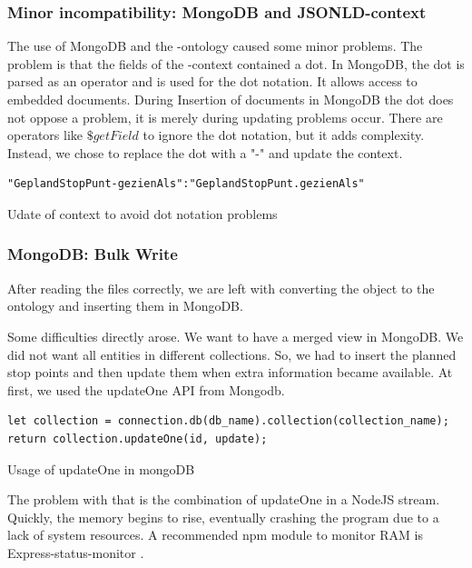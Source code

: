 \subsubsection{Minor incompatibility: MongoDB and JSONLD-context}
The use of MongoDB and the -ontology caused some minor problems. The problem is that the fields of the -context contained a dot. In MongoDB, the dot is parsed as an operator and is used for the dot notation. It allows access to embedded documents. During Insertion of documents in MongoDB the dot does not oppose a problem, it is merely during updating problems occur. There are operators like $\$getField$ to ignore the dot notation, but it adds complexity. Instead, we chose to replace the dot with a "-" and update the context.

\begin{listing}[H]
    \begin{verbatim}
"GeplandStopPunt-gezienAls":"GeplandStopPunt.gezienAls"
    \end{verbatim}
    \caption{Udate of context to avoid dot notation problems}
\label{listing:context:dotnotation}
\end{listing}
\subsubsection{MongoDB: Bulk Write}
After reading the  files correctly, we are left with converting the  object to the ontology and inserting them in MongoDB.

Some difficulties directly arose. We want to have a merged view in MongoDB. We did not want all entities in different collections. So, we had to insert the planned stop points and then update them when extra information became available. At first, we used the updateOne API from Mongodb. 
\begin{listing}[H]
    \begin{verbatim}
let collection = connection.db(db_name).collection(collection_name);
return collection.updateOne(id, update);
    \end{verbatim}
    \caption{Usage of updateOne in mongoDB}
\label{listing:mongoDB:updateone}
\end{listing}
The problem with that is the combination of updateOne in a NodeJS stream. Quickly, the memory begins to rise, eventually crashing the program due to a lack of system resources. A recommended npm module to monitor RAM is Express-status-monitor \cite{noauthor_express-status-monitor_2022}.

